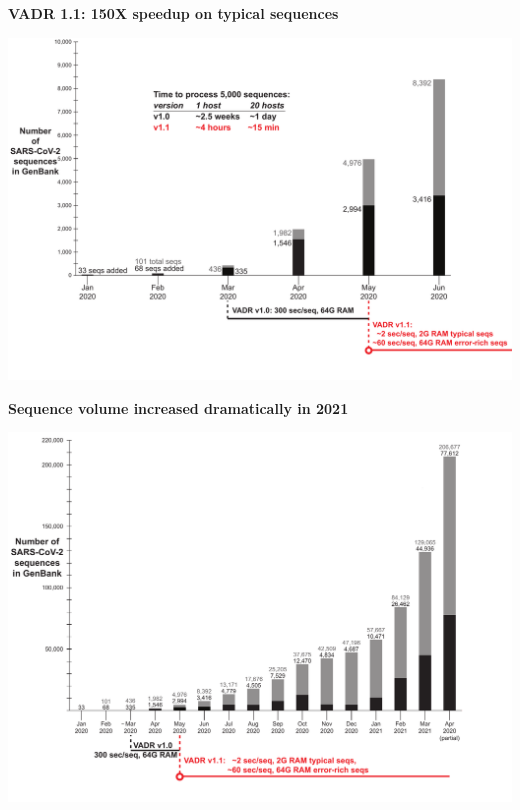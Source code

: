 \documentclass[landscape]{slides}
\begin{document}
\begin{slide}
\begin{center}
\large{\textbf{VADR 1.1: 150X speedup on typical sequences}}

\includegraphics[width=10.5in]{figs/sars-counts-jan2020-may2020-slide4}
\end{center}

\vfill
\end{slide}
\begin{slide}
\begin{center}
\textbf{Sequence volume increased dramatically in 2021}

\includegraphics[width=10.25in]{figs/sars-counts-jan2020-apr2021-slide1}
\end{center}

\vfill
\end{slide}
\end{document}
